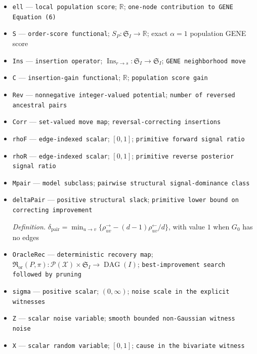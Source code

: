 \documentclass{article}
\begin{document}
\begin{itemize}
  \item \texttt{ell} --- \texttt{local population score}; \(\mathbb R\); \texttt{one-\allowbreak{}node contribution to GENE Equation (6)}
  \item \texttt{S} --- \texttt{order-\allowbreak{}score functional}; \(S_P:\mathfrak S_I\to\mathbb R\); exact \(\alpha=1\) population GENE score
  \item \texttt{Ins} --- \texttt{insertion operator}; \(\operatorname{Ins}_{r\to s}:\mathfrak S_I\to\mathfrak S_I\); \texttt{GENE neighborhood move}
  \item \texttt{C} --- \texttt{insertion-\allowbreak{}gain functional}; \(\mathbb R\); \texttt{population score gain}
  \item \texttt{Rev} --- \texttt{nonnegative integer-\allowbreak{}valued potential}; \texttt{number of reversed ancestral pairs}
  \item \texttt{Corr} --- \texttt{set-\allowbreak{}valued move map}; \texttt{reversal-\allowbreak{}correcting insertions}
  \item \texttt{rhoF} --- \texttt{edge-\allowbreak{}indexed scalar}; \([0,1]\); \texttt{primitive forward signal ratio}
  \item \texttt{rhoR} --- \texttt{edge-\allowbreak{}indexed scalar}; \([0,1]\); \texttt{primitive reverse posterior signal ratio}
  \item \texttt{Mpair} --- \texttt{model subclass}; \texttt{pairwise structural signal-\allowbreak{}dominance class}
  \item \texttt{deltaPair} --- \texttt{positive structural slack}; \texttt{primitive lower bound on correcting improvement}
  \par\smallskip\noindent\emph{Definition.} \(\delta_{\mathrm{pair}}=\min_{u\to v}\{\rho^{\to}_{uv}-(d-1)\rho^{\leftarrow}_{uv}/d\}\), with value \(1\) when \(G_0\) has no edges
  \item \texttt{OracleRec} --- \texttt{deterministic recovery map}; \(\mathfrak R_{\mathrm{or}}(P,\pi):\mathcal P(\mathcal X)\times\mathfrak S_I\to\operatorname{DAG}(I)\); \texttt{best-\allowbreak{}improvement search followed by pruning}
  \item \texttt{sigma} --- \texttt{positive scalar}; \((0,\infty)\); \texttt{noise scale in the explicit witnesses}
  \item \texttt{Z} --- \texttt{scalar noise variable}; \texttt{smooth bounded non-\allowbreak{}Gaussian witness noise}
  \item \texttt{X} --- \texttt{scalar random variable}; \([0,1]\); \texttt{cause in the bivariate witness}

\end{itemize}
\end{document}
